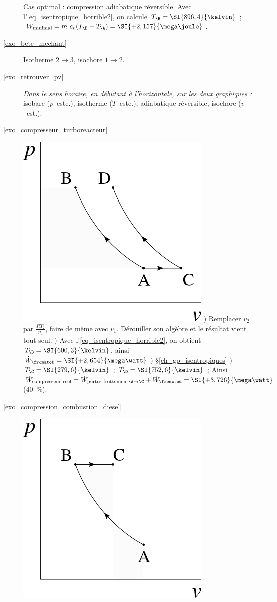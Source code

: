 \begin{description}
						\tab Cas optimal : compression adiabatique réversible. Avec l’\cref{eq_isentropique_horrible2}, on calcule $T_\B = \SI{896,4}{\kelvin}$ ; $W_\text{minimal} = m \ c_v (T_\B - T_\A) = \SI{+2,157}{\mega\joule}$.
	\item [\ref{exo_bete_mechant}] 
						\tab Isotherme $2 \to 3$, isochore $1 \to 2$.
	\item [\ref{exo_retrouver_pv}] 
						\tab \textit{Dans le sens horaire, en débutant à l’horizontale, sur les deux graphiques :} isobare ($p$~cste.), isotherme ($T$~cste.), adiabatique réversible, isochore ($v$~cst.).
	\item [\ref{exo_compresseur_turboreacteur}]
						\includegraphics[width=\solutiondiagramwidth]{images/exo_sol_pv_turbojet_compressor.png}
						) Remplacer $v_2$ par $\frac{R T_2}{p_2}$, faire de même avec $v_1$. Dérouiller son algèbre et le résultat vient tout seul.
						) Avec l’\cref{eq_isentropique_horrible2}, on obtient $T_\B = \SI{600,3}{\kelvin}$, ainsi $\dot{W}_{\fromatob} = \SI{+2,654}{\mega\watt}$ 
						) \S\ref{ch_gp_isentropiques}
						) $T_{\C} = \SI{279,6}{\kelvin}$ ; $T_\D = \SI{752,6}{\kelvin}$ ; Ainsi $\dot{W}_\text{compresseur réel} = \dot{W}_{\text{pertes frottement} \A \to \C} + \dot{W}_\fromctod = \SI{+3,726}{\mega\watt}$ (\SI{+40}{\percent}).
	\item [\ref{exo_compression_combustion_diesel}]
						\includegraphics[width=\solutiondiagramwidth]{images/exo_sol_pv_diesel.png}

\end{description}
